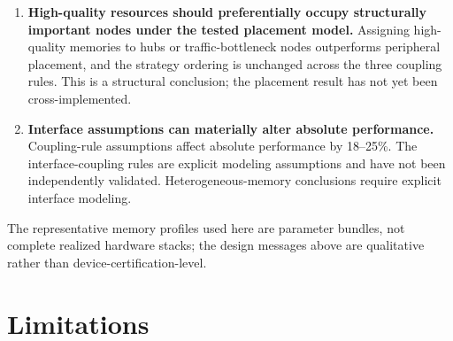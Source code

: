 \documentclass[quantumrep,article,submit,moreauthors]{Definitions/mdpi}
\begin{document}
\begin{enumerate}[leftmargin=2em]
\item \textbf{High-quality resources should preferentially occupy structurally important nodes under the tested placement model.} Assigning high-quality memories to hubs or traffic-bottleneck nodes outperforms peripheral placement, and the strategy ordering is unchanged across the three coupling rules. This is a structural conclusion; the placement result has not yet been cross-implemented.

\item \textbf{Interface assumptions can materially alter absolute performance.} Coupling-rule assumptions affect absolute performance by 18--25\%. The interface-coupling rules are explicit modeling assumptions and have not been independently validated. Heterogeneous-memory conclusions require explicit interface modeling.
\end{enumerate}

The representative memory profiles used here are parameter bundles, not complete realized hardware stacks; the design messages above are qualitative rather than device-certification-level.

\FloatBarrier

\section{Limitations}
\end{document}
